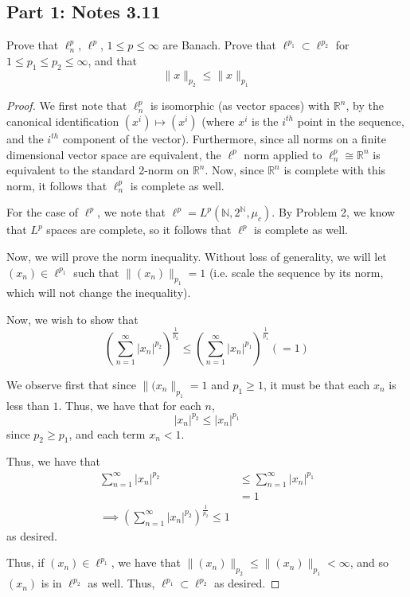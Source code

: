 \documentclass[fontsize=11pt]{scrartcl} %
\numberwithin{equation}{section} %
\numberwithin{figure}{section} %
\numberwithin{table}{section} %
\newcommand{\R}{\mathbb{R}}
\newcommand{\N}{\mathbb{N}}
\begin{document}
\subsection*{Part 1: Notes 3.11}
Prove that $\ell^p_n$, $\ell^p$, $1\leq p\leq \infty$ are Banach. Prove that
$\ell^{p_1}\subset \ell^{p_2}$ for $1\leq p_1\leq p_2\leq \infty$, and that
\[
    \|x\|_{p_2}\leq \|x\|_{p_1}
\]

\begin{proof}
    We first note that $\ell^p_n$ is isomorphic (as vector spaces) with $\R^n$,
    by the canonical identification $(x^i)\mapsto (x^i)$ (where $x^i$ is the
    $i^{th}$ point in the sequence, and the $i^{th}$ component of the vector).
    Furthermore, since all norms on a finite dimensional vector space are
    equivalent, the $\ell^p$ norm applied to $\ell^p_n\cong \R^n$ is equivalent
    to the standard 2-norm on $\R^n$. Now, since $\R^n$ is complete with this
    norm, it follows that $\ell^p_n$ is complete as well.

    For the case of $\ell^p$, we note that $\ell^p = L^p(\N,2^{\N},\mu_c)$. By
    Problem 2, we know that $L^p$ spaces are complete, so it follows that
    $\ell^p$ is complete as well.

    Now, we will prove the norm inequality. Without loss of generality, we will
    let $(x_n)\in\ell^{p_1}$ such that $\|(x_n)\|_{p_1} = 1$ (i.e. scale the
    sequence by its norm, which will not change the inequality).

    Now, we wish to show that
    \[
        \left(\sum_{n=1}^{\infty}|x_n|^{p_2}\right)^{\frac{1}{p_2}} \leq
        \left(\sum_{n=1}^{\infty}|x_n|^{p_1}\right)^{\frac{1}{p_1}} (=1)
    \]

    We observe first that since $\|(x_n\|_{p_1} = 1$ and $p_1\geq 1$, it must be
    that each $x_n$ is less than $1$. Thus, we have that for each $n$,
    \[
        |x_n|^{p_2}\leq |x_n|^{p_1}
    \]
    since $p_2 \geq p_1$, and each term $x_n < 1$.

    Thus, we have that
    \[
        \begin{aligned}
            \sum_{n=1}^{\infty}|x_n|^{p_2} &\leq
            \sum_{n=1}^{\infty}|x_n|^{p_1}\\
            &= 1\\
            \implies 
        \left(\sum_{n=1}^{\infty}|x_n|^{p_2}\right)^{\frac{1}{p_2}} \leq 1
        \end{aligned}
    \]
    as desired.

    Thus, if $(x_n)\in\ell^{p_1}$, we have that
    $\|(x_n)\|_{p_2}\leq\|(x_n)\|_{p_1} < \infty$, and so $(x_n)$ is in
    $\ell^{p_2}$ as well. Thus, $\ell^{p_1}\subset\ell^{p_2}$ as desired.
\end{proof}
\end{document}
